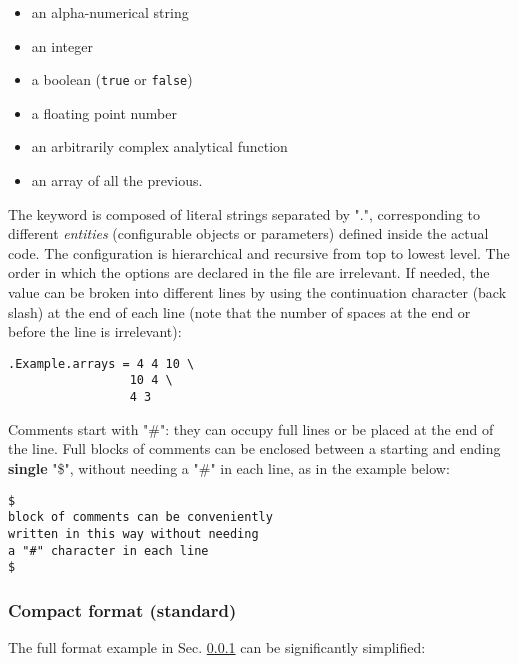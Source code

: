 \documentclass[11pt]{article}
\begin{document}
\begin{itemize}
\item
  an alpha-numerical string
\item
  an integer
\item 
  a boolean (\texttt{true} or \texttt{false})
\item
  a floating point number
\item
  an arbitrarily complex analytical function
\item
  an array of all the previous.
\end{itemize}
The keyword is composed of literal strings separated by ".",
corresponding to different \textit{entities} (configurable
objects or parameters) defined inside the actual code. The
configuration is hierarchical and recursive from top to lowest
level. The order in which the options are declared in the file are
irrelevant. If needed, the value can be broken into different lines by using the continuation character (back slash) 
at the end of each line (note that the number of spaces at the end or
before the line is irrelevant):
\vspace{-0.2cm}
\begin{verbatim}
.Example.arrays = 4 4 10 \
                 10 4 \
                 4 3
\end{verbatim}
Comments start with "\#": they can occupy full lines or be
placed at the end of the line. Full blocks of comments can be enclosed 
between a starting and ending \textbf{single} "\$", without needing a "\#" in each
line, as in the example below:
\vspace{-0.2cm}
\begin{verbatim}
$
block of comments can be conveniently 
written in this way without needing
a "#" character in each line 
$
\end{verbatim} 

\subsubsection{Compact format (standard)}\label{ssec:compact_format}

The full format example in Sec. \ref{ssec:compact_format} can be
significantly simplified:
\end{document}
